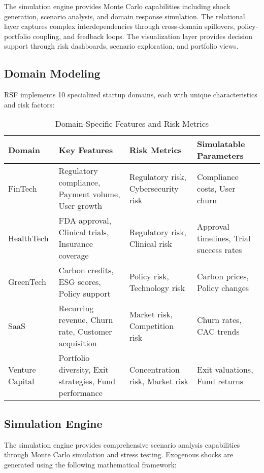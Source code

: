 \documentclass[conference]{IEEEtran}
\begin{document}
The simulation engine provides Monte Carlo capabilities including shock generation, scenario analysis, and domain response simulation. The relational layer captures complex interdependencies through cross-domain spillovers, policy-portfolio coupling, and feedback loops. The visualization layer provides decision support through risk dashboards, scenario exploration, and portfolio views.

\subsection{Domain Modeling}

RSF implements 10 specialized startup domains, each with unique characteristics and risk factors:

\begin{table}[H]
\centering
\caption{Domain-Specific Features and Risk Metrics}
\label{tab:domain_features}
\begin{tabular}{@{}llll@{}}
\toprule
\textbf{Domain} & \textbf{Key Features} & \textbf{Risk Metrics} & \textbf{Simulatable Parameters} \\
\midrule
FinTech & Regulatory compliance, Payment volume, User growth & Regulatory risk, Cybersecurity risk & Compliance costs, User churn \\
HealthTech & FDA approval, Clinical trials, Insurance coverage & Regulatory risk, Clinical risk & Approval timelines, Trial success rates \\
GreenTech & Carbon credits, ESG scores, Policy support & Policy risk, Technology risk & Carbon prices, Policy changes \\
SaaS & Recurring revenue, Churn rate, Customer acquisition & Market risk, Competition risk & Churn rates, CAC trends \\
Venture Capital & Portfolio diversity, Exit strategies, Fund performance & Concentration risk, Market risk & Exit valuations, Fund returns \\
\bottomrule
\end{tabular}
\end{table}

\subsection{Simulation Engine}

The simulation engine provides comprehensive scenario analysis capabilities through Monte Carlo simulation and stress testing. Exogenous shocks are generated using the following mathematical framework:
\end{document}
